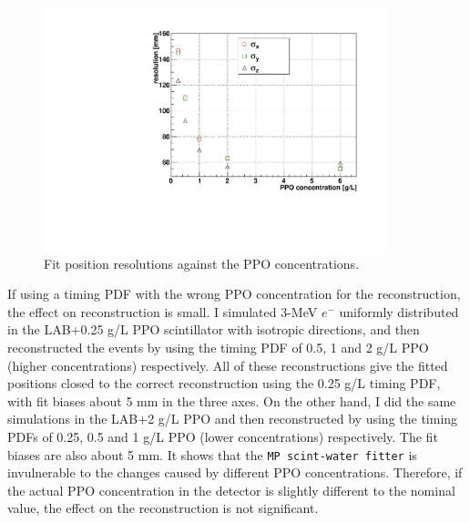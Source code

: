 \begin{figure}[!htb]
	\centering
	\includegraphics[width=10cm]{partialResolVsPPO.pdf}
	\caption{Fit position resolutions against the PPO concentrations.}
	\label{fig:partialResolVsPPO}
\end{figure}

If using a timing PDF with the wrong PPO concentration for the reconstruction, the effect on reconstruction is small\cite{partialFitterPDFtestInvulnerable}. I simulated 3-MeV $e^-$ uniformly distributed in the LAB+0.25 g/L PPO scintillator with isotropic directions, and then reconstructed the events by using the timing PDF of 0.5, 1 and 2 g/L PPO (higher concentrations) respectively. All of these reconstructions give the fitted positions closed to the correct reconstruction using the 0.25 g/L timing PDF, with fit biases about 5 mm in the three axes. On the other hand, I did the same simulations in the LAB+2 g/L PPO and then reconstructed by using the timing PDFs of 0.25, 0.5 and 1 g/L PPO  (lower concentrations) respectively. The fit biases are also about 5 mm. It shows that the \texttt{MP scint-water fitter} is invulnerable to the changes caused by different PPO concentrations. Therefore, if the actual PPO concentration in the detector is slightly different to the nominal value, the effect on the reconstruction is not significant.

